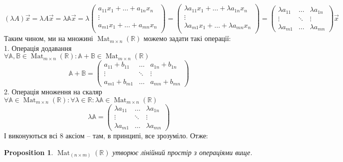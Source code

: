 \documentclass[a4paper, 10pt]{article}
\theoremstyle{theoremdd}
\newtheorem{proposition}[theorem]{Proposition}
\DeclareMathOperator{\Mat}{Mat}
\begin{document}
	$(\lambda A)\vec{x} = \lambda A \vec{x} = \lambda \mathbb{A} \vec{x} = \lambda \begin{pmatrix}
	a_{11}x_1 + \dots + a_{1n} x_n \\
	\vdots \\
	a_{m1}x_1 + \dots + a_{mn} x_n \\
	\end{pmatrix}
	= \begin{pmatrix}
	\lambda a_{11}x_1 + \dots + \lambda a_{1n} x_n \\
	\vdots \\
	\lambda a_{m1} x_1 + \dots + \lambda a_{mn} x_n \\
	\end{pmatrix} = \begin{pmatrix}
	\lambda a_{11} & \dots & \lambda a_{1n}\\
	\vdots & \ddots & \vdots \\
	\lambda a_{m1} & \dots & \lambda a_{mn}
	\end{pmatrix} \vec{x}$
	\bigskip \\
	Таким чином, ми на множині $\Mat_{m \times n}(\mathbb{R})$ можемо задати такі операції:\\
	1. Операція додавання\\
	$\forall \mathbb{A}, \mathbb{B} \in \Mat_{m \times n}(\mathbb{R}): \mathbb{A} + \mathbb{B} \in \Mat_{m \times n}(\mathbb{R})$\\
	$$\mathbb{A} + \mathbb{B} = \begin{pmatrix}
	a_{11} + b_{11} & \dots & a_{1n} + b_{1n} \\
	\vdots & \ddots & \vdots \\
	a_{m1} + b_{m1} & \dots & a_{mn} + b_{mn}
	\end{pmatrix}$$
	2. Операція множення на скаляр\\
	$\forall \mathbb{A} \in \Mat_{m \times n}(\mathbb{R}): \forall \lambda \in \mathbb{R}: \lambda \mathbb{A} \in \Mat_{m \times n}(\mathbb{R})$\\
	$$\lambda \mathbb{A} = \begin{pmatrix}
	\lambda a_{11} & \dots & \lambda a_{1n}\\
	\vdots & \ddots & \vdots \\
	\lambda a_{m1} & \dots & \lambda a_{mn}
	\end{pmatrix}$$
	І виконуються всі 8 аксіом -- там, в принципі, все зрозуміло. Отже:
	
	\begin{proposition}
	$\Mat_{(n \times m)}(\mathbb{R})$ утворює лінійний простір з операціями вище.
	\end{proposition}
	
\end{document}
